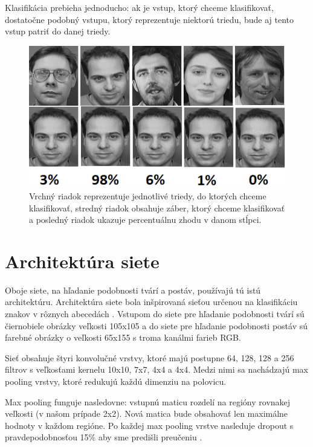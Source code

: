 Klasifikácia prebieha jednoducho: ak je vstup, ktorý chceme klasifikovať, dostatočne podobný vstupu, ktorý reprezentuje niektorú triedu, bude aj tento vstup patriť do danej triedy.

\begin{figure}[H]
\centerline{\includegraphics[width=1\textwidth]{images/oneshot_classification}}
\caption[Klasifikácia pomocou siamskej neurónovej siete]{Vrchný riadok reprezentuje jednotlivé triedy, do ktorých chceme klasifikovať, stredný riadok obsahuje záber, ktorý chceme klasifikovať a posledný riadok ukazuje percentuálnu zhodu v danom stĺpci.}
\label{obr:oneshot_classification}
\end{figure}

\section{Architektúra siete} \label{kap:siamese_architecture}
Oboje siete, na hľadanie podobnosti tvárí a postáv, používajú tú istú architektúru.
Architektúra siete bola inšpirovaná sieťou určenou na klasifikáciu znakov v rôznych abecedách \cite{siamese_architecture}.
Vstupom do siete pre hľadanie podobnosti tvárí sú čiernobiele obrázky veľkosti 105x105 a 
do siete pre hľadanie podobnosti postáv sú farebné obrázky o veľkosti 65x155 s troma kanálmi farieb RGB.

Sieť obsahuje štyri konvolučné vrstvy, ktoré majú postupne 64, 128, 128 a 256 filtrov s veľkosťami kernelu 10x10, 7x7, 4x4 a 4x4.
Medzi nimi sa nachádzajú max pooling vrstvy, ktoré redukujú každú dimenziu na polovicu.

Max pooling funguje nasledovne: vstupnú maticu rozdelí na regióny rovnakej veľkosti (v našom prípade 2x2). 
Nová matica bude obsahovať len maximálne hodnoty v každom regióne.
Po každej max pooling vrstve nasleduje dropout s pravdepodobnosťou 15\% aby sme predišli preučeniu \cite{JMLR:v15:srivastava14a}. 

